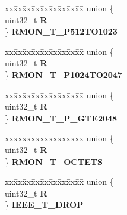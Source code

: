\begin{DoxyCompactItemize}
\begin{tabbing}
\end{tabbing}\item 
\mbox{\label{structFEC__tag_af3e6c886b53c20107e57bf8c5c71ab46}} 
\begin{tabbing}
xx\=xx\=xx\=xx\=xx\=xx\=xx\=xx\=xx\=\kill
union \{\\
\>uint32\_t {\bfseries R}\\
\} {\bfseries RMON\_T\_P512TO1023}\\

\end{tabbing}\item 
\mbox{\label{structFEC__tag_a9da000e4e93fb687f7186151ac2d55c6}} 
\begin{tabbing}
xx\=xx\=xx\=xx\=xx\=xx\=xx\=xx\=xx\=\kill
union \{\\
\>uint32\_t {\bfseries R}\\
\} {\bfseries RMON\_T\_P1024TO2047}\\

\end{tabbing}\item 
\mbox{\label{structFEC__tag_a55a34a512498c57b57a153dee4dbe1c7}} 
\begin{tabbing}
xx\=xx\=xx\=xx\=xx\=xx\=xx\=xx\=xx\=\kill
union \{\\
\>uint32\_t {\bfseries R}\\
\} {\bfseries RMON\_T\_P\_GTE2048}\\

\end{tabbing}\item 
\mbox{\label{structFEC__tag_ad4dfed5b55bbea5c45b1245d8a0d9880}} 
\begin{tabbing}
xx\=xx\=xx\=xx\=xx\=xx\=xx\=xx\=xx\=\kill
union \{\\
\>uint32\_t {\bfseries R}\\
\} {\bfseries RMON\_T\_OCTETS}\\

\end{tabbing}\item 
\mbox{\label{structFEC__tag_a45e7dda3bb8f52c87210ba4e57c2248a}} 
\begin{tabbing}
xx\=xx\=xx\=xx\=xx\=xx\=xx\=xx\=xx\=\kill
union \{\\
\>uint32\_t {\bfseries R}\\
\} {\bfseries IEEE\_T\_DROP}\\


\end{tabbing}
\end{DoxyCompactItemize}
